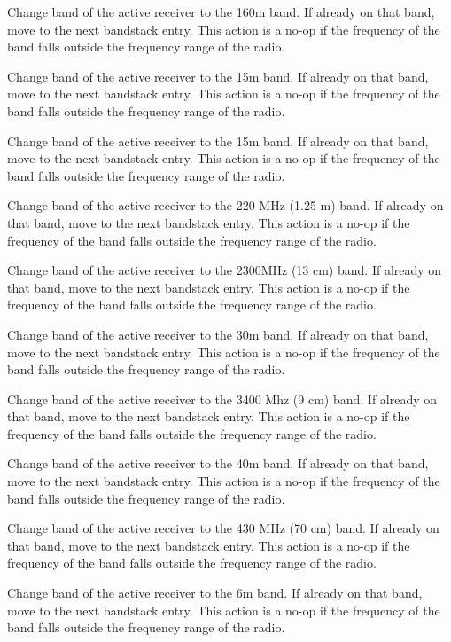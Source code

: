 \documentclass[12pt]{book}
\begin{document}
{Change band of the active receiver to the 160m band. If already on that band, move to
the next bandstack entry. This action is a no-op if the frequency of the band falls outside the frequency
range of the radio.}

{Change band of the active receiver to the 15m band. If already on that band, move to
the next bandstack entry. This action is a no-op if the frequency of the band falls outside the frequency
range of the radio.}

{Change band of the active receiver to the 15m band. If already on that band, move to
the next bandstack entry. This action is a no-op if the frequency of the band falls outside the frequency
range of the radio.}

{Change band of the active receiver to the 220 MHz (1.25 m) band. If already on that band, move to
the next bandstack entry. This action is a no-op if the frequency of the band falls outside the frequency
range of the radio.}

{Change band of the active receiver to the 2300MHz (13 cm) band. If already on that band, move to
the next bandstack entry. This action is a no-op if the frequency of the band falls outside the frequency
range of the radio.}

{Change band of the active receiver to the 30m band. If already on that band, move to
the next bandstack entry. This action is a no-op if the frequency of the band falls outside the frequency
range of the radio.}

{Change band of the active receiver to the 3400 Mhz (9 cm) band. If already on that band, move to
the next bandstack entry. This action is a no-op if the frequency of the band falls outside the frequency
range of the radio.}

{Change band of the active receiver to the 40m band. If already on that band, move to
the next bandstack entry. This action is a no-op if the frequency of the band falls outside the frequency
range of the radio.}

{Change band of the active receiver to the 430 MHz (70 cm) band. If already on that band, move to
the next bandstack entry. This action is a no-op if the frequency of the band falls outside the frequency
range of the radio.}

{Change band of the active receiver to the 6m band. If already on that band, move to
the next bandstack entry. This action is a no-op if the frequency of the band falls outside the frequency
range of the radio.}
\end{document}
